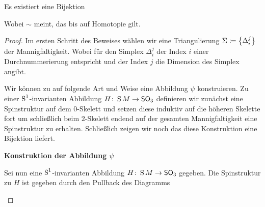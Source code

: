 \begin{Satz}
	Es existiert eine Bijektion
	\begin{center}
	\end{center}
	Wobei $ \sim $ meint, das bis auf Homotopie gilt.
	\begin{proof}
          Im ersten Schritt des Beweises wählen wir eine
          Triangulierung $\Sigma \coloneqq \sset{ \Delta_i^j}$ der
          Mannigfaltigkeit. Wobei für den Simplex $\Delta_i^j$ der
          Index $i$ einer Durchnummerierung entspricht und der Index
          $j$ die Dimension des Simplex angibt.  
		
          Wir können zu auf folgende Art und Weise eine Abbildung
          $\psi$ konstruieren.  Zu einer $\S^1$-invarianten Abbildung
          $\abb{H}{\S M}{\so_3}$ definieren wir zunächst eine
          Spinstruktur auf dem $0$-Skelett und setzen diese induktiv
          auf die höheren Skelette fort um schließlich beim
          $2$-Skelett endend auf der gesamten Mannigfaltigkeit eine
          Spinstruktur zu erhalten. Schließlich zeigen wir noch das
          diese Konstruktion eine Bijektion liefert.
		
          \textbf{Konstruktion der Abbildung $\psi$}
		
          Sei nun eine $\S^1$-invarianten Abbildung
          $\abb{H}{\S M}{\so_3}$ gegeben. Die Spinstruktur zu $ H $
          ist gegeben durch den Pullback des Diagramms $  $
              \begin{center}
            \end{center}
          

\end{proof}
\end{Satz}
